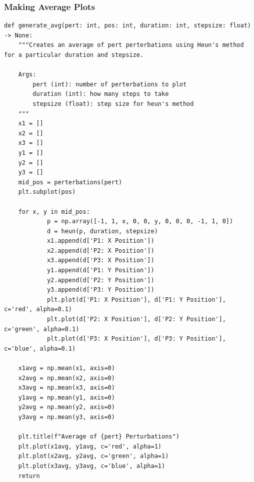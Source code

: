 \documentclass{article}
\begin{document}
\subsubsection{Making Average Plots}
\begin{verbatim}
def generate_avg(pert: int, pos: int, duration: int, stepsize: float) -> None:
    """Creates an average of pert perterbations using Heun's method for a particular duration and stepsize.

    Args:
        pert (int): number of perterbations to plot
        duration (int): how many steps to take
        stepsize (float): step size for heun's method
    """
    x1 = []
    x2 = []
    x3 = []
    y1 = []
    y2 = []
    y3 = []
    mid_pos = perterbations(pert)
    plt.subplot(pos)

    for x, y in mid_pos:
            p = np.array([-1, 1, x, 0, 0, y, 0, 0, 0, -1, 1, 0])
            d = heun(p, duration, stepsize)
            x1.append(d['P1: X Position'])
            x2.append(d['P2: X Position'])
            x3.append(d['P3: X Position'])
            y1.append(d['P1: Y Position'])
            y2.append(d['P2: Y Position'])
            y3.append(d['P3: Y Position'])
            plt.plot(d['P1: X Position'], d['P1: Y Position'], c='red', alpha=0.1)
            plt.plot(d['P2: X Position'], d['P2: Y Position'], c='green', alpha=0.1)
            plt.plot(d['P3: X Position'], d['P3: Y Position'], c='blue', alpha=0.1)

    x1avg = np.mean(x1, axis=0)
    x2avg = np.mean(x2, axis=0)
    x3avg = np.mean(x3, axis=0)
    y1avg = np.mean(y1, axis=0)
    y2avg = np.mean(y2, axis=0)
    y3avg = np.mean(y3, axis=0)

    plt.title(f"Average of {pert} Perturbations")
    plt.plot(x1avg, y1avg, c='red', alpha=1)
    plt.plot(x2avg, y2avg, c='green', alpha=1)
    plt.plot(x3avg, y3avg, c='blue', alpha=1)
    return
\end{verbatim}
\end{document}
